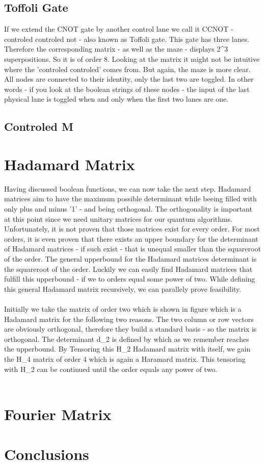 \documentclass[oneside]{thesisclass}
\begin{document}
\section{Toffoli Gate}
If we extend the CNOT gate by another control lane we call it CCNOT - controled controled not - also known as Toffoli gate.
This gate has three lanes.
Therefore the corresponding matrix - as well as the maze - displays 2^3 superpositions.
So it is of order 8.
Looking at the matrix%
it might not be intuitive where the 'controled controled' comes from.
But again, the maze%
is more clear. 
All nodes are connected to their identity, only the last two are toggled.
In other words - if you look at the boolean strings of these nodes - the input of the last physical lane is toggled when and only when the first two lanes are one.

\section{Controled M}

\chapter{Hadamard Matrix}
Having discussed boolean functions, we can now take the next step.
Hadamard matrices aim to have the maximum possible determinant while beeing filled with only plus and minus '1' - and being orthogonal.
The orthogonality is important at this point since we need unitary matrices for our quantum algorithms.
Unfortunately, it is not proven that those matrices exist for every order.
For most orders, it is even proven that there exists an upper boundary for the determinant of Hadamard matrices - if such exist - that is unequal smaller than the squareroot of the order.
The general upperbound for the Hadamard matrices determinant is the squareroot of the order.
Luckily we can easily find Hadamard matrices that fulfill%
this upperbound - if we %
to orders equal some power of two.
While defining this general Hadamard matrix recursively, we can parallely prove feasibility.\\
\\Initially we take the matrix of order two which is shown in figure %
which is a Hadamard matrix for the following two reasons.
The two column or row vectors are obviously orthogonal, therefore they build a standard basis - so the matrix is orthogonal.
The determinant d_2 is defined by %
which as we remember reaches the upperbound.
By Tensoring this H_2 Hadamard matrix with itself, we gain the H_4 matrix of order 4 which is again a Haramard matrix.
This tensoring with H_2 can be continued until the order equals any power of two.\\
\\%

\chapter{Fourier Matrix}

\chapter{Conclusions}




\end{document}
